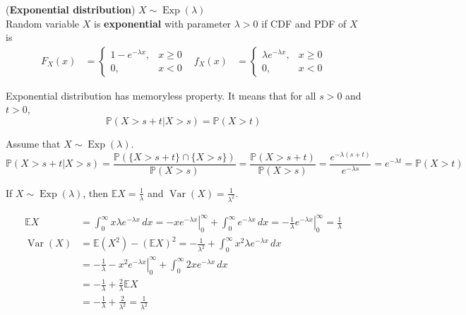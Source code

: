 \documentclass{huhtakm-template-book}
\newcommand{\prob}{\mathbb{P}}
\newcommand{\expect}{\mathbb{E}}
\DeclareMathOperator{\Exp}{Exp}
\DeclareMathOperator{\Var}{Var}
\begin{document}
\newpage
\begin{eg}(\textbf{Exponential distribution}) $X\sim\Exp(\lambda)$\\
	Random variable $X$ is \textbf{exponential} with parameter $\lambda>0$ if CDF and PDF of $X$ is
	\begin{align*}
		F_{X}(x)&=\begin{cases}
			1-e^{-\lambda x}, &x\geq 0\\
			0, &x<0
		\end{cases} & f_{X}(x)&=\begin{cases}
			\lambda e^{-\lambda x}, &x\geq 0\\
			0, &x<0
		\end{cases}
	\end{align*}
\end{eg}
\begin{thm}
	Exponential distribution has memoryless property. It means that for all $s>0$ and $t>0$,
	\begin{equation*}
		\prob(X>s+t|X>s)=\prob(X>t)
	\end{equation*}
\end{thm}
\begin{proofing}
	Assume that $X\sim\Exp(\lambda)$.
	\begin{equation*}
		\prob(X>s+t|X>s)=\frac{\prob(\{X>s+t\}\cap\{X>s\})}{\prob(X>s)}=\frac{\prob(X>s+t)}{\prob(X>s)}=\frac{e^{-\lambda(s+t)}}{e^{-\lambda s}}=e^{-\lambda t}=\prob(X>t)
	\end{equation*}
\end{proofing}
\begin{thm}
	If $X\sim\Exp(\lambda)$, then $\expect{X}=\frac{1}{\lambda}$ and $\Var(X)=\frac{1}{\lambda^{2}}$.
\end{thm}
\begin{proofing}
	\begin{align*}
		\expect{X}&=\int_{0}^{\infty}x\lambda e^{-\lambda x}\,dx=\left.-xe^{-\lambda x}\right|_{0}^{\infty}+\int_{0}^{\infty}e^{-\lambda x}\,dx=\left.-\frac{1}{\lambda}e^{-\lambda x}\right|_{0}^{\infty}=\frac{1}{\lambda}\\
		\Var(X)&=\expect(X^{2})-(\expect{X})^{2}=-\frac{1}{\lambda^{2}}+\int_{0}^{\infty}x^{2}\lambda e^{-\lambda x}\,dx\\
		&=-\frac{1}{\lambda}-\left.x^{2}e^{-\lambda x}\right|_{0}^{\infty}+\int_{0}^{\infty}2xe^{-\lambda x}\,dx\\
		&=-\frac{1}{\lambda}+\frac{2}{\lambda}\expect{X}\\
		&=-\frac{1}{\lambda}+\frac{2}{\lambda^{2}}=\frac{1}{\lambda^{2}}
	\end{align*}
\end{proofing}
\end{document}
